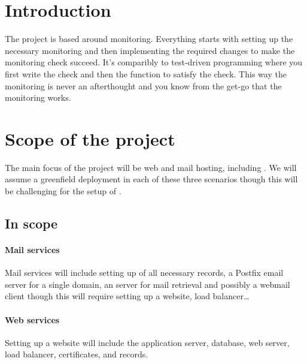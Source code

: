 \documentclass[a4paper,12pt]{scrartcl}
\begin{document}
\maketitle


\section{Introduction}
\label{sec:introduction}
The  project is based around monitoring.
Everything starts with setting up the necessary monitoring and then implementing the required changes to make the monitoring check succeed.
It's comparibly to test-driven programming where you first write the check and then the function to satisfy the check.
This way the monitoring is never an afterthought and you know from the get-go that the monitoring works.


\section{Scope of the project}
\label{sec:scope}
The main focus of the project will be web and mail hosting, including .
We will assume a greenfield deployment in each of these three scenarios though this will be challenging for the setup of .

\subsection{In scope}

\paragraph{Mail services}
Mail services will include setting up of all necessary  records, a Postfix email server for a single domain, an  server for mail retrieval and possibly a webmail client though this will require setting up a website, load balancer\ldots

\paragraph{Web services}
Setting up a website will include the application server, database, web server, load balancer, certificates, and  records.
\end{document}
